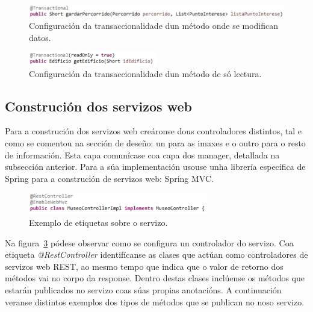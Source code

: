 \begin{figure}[H] 
	\begin{center}
		\includegraphics[width=1\textwidth]{figures/codigo/metodoTransaccional}
		\caption{Configuración da transaccionalidade dun método onde se modifican datos.}
		\label{fig:metodoTransaccional}
	\end{center}
\end{figure}

\begin{figure}[H] 
	\begin{center}
		\includegraphics[width=0.5\textwidth]{figures/codigo/metodoNonTransaccional}
		\caption{Configuración da transaccionalidade dun método de só lectura.}
		\label{fig:metodoNonTransaccional}
	\end{center}
\end{figure}


\subsection{Construción dos servizos web}
Para a construción dos servizos web creáronse dous controladores distintos, tal e como se comentou na sección de deseño: un para as imaxes e o outro para o resto de información. Esta capa comunícase coa capa dos manager, detallada na subsección anterior. Para a súa implementación usouse unha librería específica de Spring para a construción de servizos web: Spring MVC.

\begin{figure}[tbh] 
	\begin{center}
		\includegraphics[width=0.7\textwidth]{figures/codigo/controladorMuseo}
		\caption{Exemplo de etiquetas sobre o servizo.}
		\label{fig:controladorMuseo}
	\end{center}
\end{figure}

Na figura~\ref{fig:controladorMuseo} pódese observar como se configura un controlador do servizo. Coa etiqueta \emph{@RestController} identifícanse as clases que actúan como controladores de servizos web REST, ao mesmo tempo que indica que o valor de retorno dos métodos vai no corpo da response. Dentro destas clases inclúense os métodos que estarán publicados no servizo coas súas propias anotacións. A continuación veranse distintos exemplos dos tipos de métodos que se publican no noso servizo.

